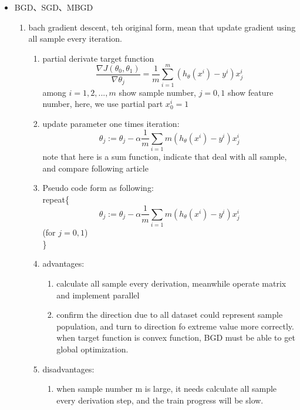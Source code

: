 \documentclass[12pt]{ctexart}%
\begin{document}
\begin{itemize}
			\item BGD、SGD、MBGD
			\begin{enumerate}[(1)]
				\item bach gradient descent, teh original form, mean that update gradient using all sample every iteration.
					\begin{enumerate}
						\item partial derivate target function
								\begin{equation}
									\frac{\nabla J(\theta_0, \theta_1)}{\nabla \theta_j} = \frac{1}{m}\sum_{i=1}^{m}(h_\theta(x^i) - y^i)x_j^i
								\end{equation}
								among $i = 1,2,...,m$ show sample number, $j = 0,1$ show feature number, here, we use partial part $x_0^i = 1$
								
						\item update parameter one times iteration:
								\begin{equation}
									\theta_j := \theta_j - \alpha\frac{1}{m}\sum_{i=1}{m}(h_\theta(x^i) - y^i)x_j^i
								\end{equation}
								note that here is a sum function, indicate that deal with all sample, and compare following article
								
						\item Pseudo code form as following:\\
						repeat\{
							$$\theta_j := \theta_j - \alpha\frac{1}{m}\sum_{i=1}{m}(h_\theta(x^i) - y^i)x_j^i$$
							\qquad \qquad \qquad(for $j = 0,1$)\\
						\}
						
						\item advantages:
						\begin{enumerate}
							\item calculate all sample every derivation, meanwhile operate matrix and implement parallel
							\item confirm the direction due to all dataset could represent sample population, and turn to direction fo extreme value more correctly. when target function is convex function, BGD must be able to get global optimization.
						\end{enumerate}
					
						\item disadvantages:
						\begin{enumerate}
							\item when sample number m is large, it needs calculate all sample every derivation step, and the train progress will be slow.
						\end{enumerate}
					

\end{enumerate}
\end{enumerate}
\end{itemize}
\end{document}
